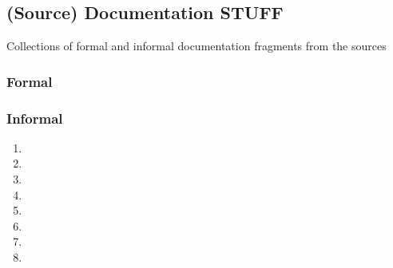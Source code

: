 \subsection{(Source) Documentation STUFF}

Collections of formal and informal documentation fragments
from the sources

\subsubsection{Formal}

\textrule



\textrule



\textrule



\textrule



\textrule



\textrule

\subsubsection{Informal}

\textrule



\textrule



\textrule



\textrule



\textrule



\textrule



\textrule



\textrule



\textrule

\begin{enumerate}
\item

\item

\item

\item

\item

\item

\item

\item

\end{enumerate}

